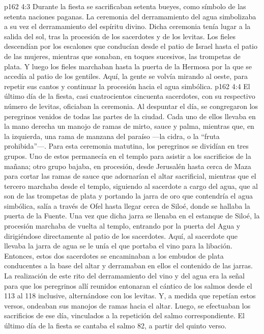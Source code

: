 \vs p162 4:3 Durante la fiesta se sacrificaban setenta bueyes, como símbolo de las setenta naciones paganas. La ceremonia del derramamiento del agua simbolizaba a su vez el derramamiento del espíritu divino. Dicha ceremonia tenía lugar a la salida del sol, tras la procesión de los sacerdotes y de los levitas. Los fieles descendían por los escalones que conducían desde el patio de Israel hasta el patio de las mujeres, mientras que sonaban, en toques sucesivos, las trompetas de plata. Y luego los fieles marchaban hasta la puerta de la Hermosa por la que se accedía al patio de los gentiles. Aquí, la gente se volvía mirando al oeste, para repetir sus cantos y continuar la procesión hacia el agua simbólica.
\vs p162 4:4 \pc El último día de la fiesta, casi cuatrocientos cincuenta sacerdotes, con su respectivo número de levitas, oficiaban la ceremonia. Al despuntar el día, se congregaron los peregrinos venidos de todas las partes de la ciudad. Cada uno de ellos llevaba en la mano derecha un manojo de ramas de mirto, sauce y palma, mientras que, en la izquierda, una rama de manzana del paraíso ---la cidra, o la “fruta prohibida”---. Para esta ceremonia matutina, los peregrinos se dividían en tres grupos. Uno de estos permanecía en el templo para asistir a los sacrificios de la mañana; otro grupo bajaba, en procesión, desde Jerusalén hasta cerca de Maza para cortar las ramas de sauce que adornarían el altar sacrificial, mientras que el tercero marchaba desde el templo, siguiendo al sacerdote a cargo del agua, que al son de las trompetas de plata y portando la jarra de oro que contendría el agua simbólica, salía a través de Ofel hasta llegar cerca de Siloé, donde se hallaba la puerta de la Fuente. Una vez que dicha jarra se llenaba en el estanque de Siloé, la procesión marchaba de vuelta al templo, entrando por la puerta del Agua y dirigiéndose directamente al patio de los sacerdotes. Aquí, al sacerdote que llevaba la jarra de agua se le unía el que portaba el vino para la libación. Entonces, estos dos sacerdotes se encaminaban a los embudos de plata conducentes a la base del altar y derramaban en ellos el contenido de las jarras. La realización de este rito del derramamiento del vino y del agua era la señal para que los peregrinos allí reunidos entonaran el cántico de los salmos desde el 113 al 118 inclusive, alternándose con los levitas. Y, a medida que repetían estos versos, ondeaban sus manojos de ramas hacia el altar. Luego, se efectuaban los sacrificios de ese día, vinculados a la repetición del salmo correspondiente. El último día de la fiesta se cantaba el salmo 82, a partir del quinto verso.
